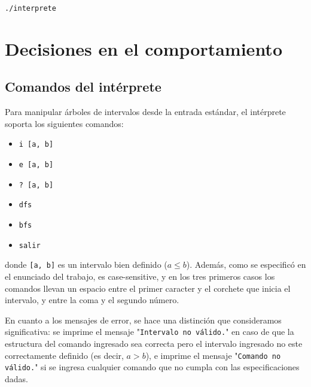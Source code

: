 \documentclass[11pt]{article}
\begin{document}
 \noindent \verb|./interprete| \par
 
 
 \section{Decisiones en el comportamiento}
 
 \subsection{Comandos del intérprete}
 
 Para manipular árboles de intervalos desde la entrada estándar, el intérprete soporta los siguientes comandos:
 
 \vspace{-0.5cm}
 \begin{itemize}
     \item \verb|i [a, b]|
     \vspace{-0.3cm}
     \item \verb|e [a, b]|
     \vspace{-0.3cm}
     \item \verb|? [a, b]|
     \vspace{-0.3cm}
     \item \verb|dfs|
     \vspace{-0.3cm}
     \item \verb|bfs|
     \vspace{-0.3cm}
     \item \verb|salir|
 \end{itemize}
 \vspace{-0.5cm}
 
 
 \noindent donde \verb|[a, b]| es un intervalo bien definido ($a \le b$).
 Además, como se especificó en el enunciado del trabajo, es case-sensitive, y en los tres primeros casos los comandos llevan un espacio entre el primer caracter y el corchete que inicia el intervalo, y entre la coma y el segundo número. \par
 
 En cuanto a los mensajes de error, se hace una distinción que consideramos significativa: se imprime el mensaje "\verb|Intervalo no válido.|" en caso de que la estructura del comando ingresado sea correcta pero el intervalo ingresado no este correctamente definido (es decir, $a > b$), e imprime el mensaje "\verb|Comando no válido.|" si se ingresa cualquier comando que no cumpla con las especificaciones dadas. \par
 
\end{document}
